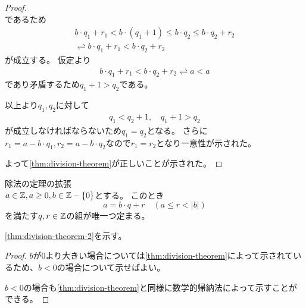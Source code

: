 \documentclass[uplatex, 11pt, a4j, dvipdfmx]{jsarticle}
\begin{document}
\begin{proof}
\begin{equation}
      \end{equation}
      であるため
      \begin{equation} \begin{aligned}
        b \cdot q_1 + r_1 < b \cdot (q_1 + 1) \leq b \cdot q_2 \leq b \cdot q_2 + r_2 \\
        \rightleftharpoons b \cdot q_1 + r_1 <  b \cdot q_2 + r_2
      \end{aligned} \end{equation}
      が成立する。
      仮定より
      \begin{equation} \begin{aligned}
        b \cdot q_1 + r_1 < b \cdot q_2 + r_2 \rightleftharpoons a < a
      \end{aligned} \end{equation}
      であり矛盾するため$q_1 + 1 > q_2$である。

      以上より$q_1, q_2$に対して
      \begin{equation}\begin{gathered}
        q_1 < q_2 + 1, \quad q_1 + 1 > q_2
      \end{gathered}\end{equation}
      が成立しなければならないため$q_1 = q_2$となる。
      さらに$r_1 = a - b \cdot q_1, r_2 = a - b \cdot q_2$なので$r_1 = r_2$となり一意性が示された。

      よって\cref{thm:division-theorem}が正しいことが示された。
    \end{proof}

    \begin{screen}
      \begin{thm}
        \label{thm:division-theorem-2}
        除法の定理の拡張\\
        $a \in \mathbb{Z}, a \geq 0, b \in \mathbb{Z} - \{0\}$とする。
        このとき
        \begin{equation}
          a = b \cdot q + r \quad (a \leq r < |b|)
        \end{equation}
        を満たす$q, r \in \mathbb{Z}$の組が唯一つ定まる。
      \end{thm}
    \end{screen}

    \cref{thm:division-theorem-2}を示す。
    \begin{proof}
      $b$が$0$より大きい場合については\cref{thm:division-theorem}によって示されているため、$b < 0$の場合について示せばよい。

      $b < 0$の場合も\cref{thm:division-theorem}と同様に数学的帰納法によって示すことができる。%
    \end{proof}
\end{document}
